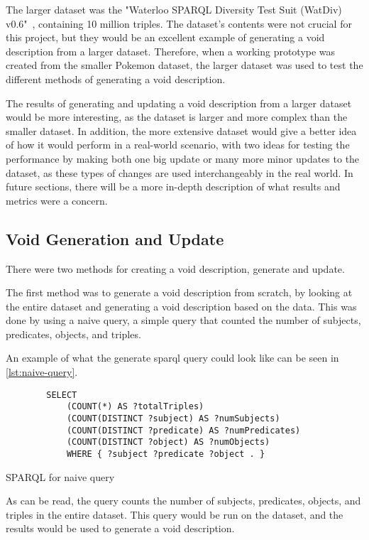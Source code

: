 The larger dataset was the "Waterloo SPARQL Diversity Test Suit (WatDiv) v0.6"~\cite{WatDiv}, containing 10 million triples. The dataset's contents were not crucial for this project, but they would be an excellent example of generating a \gls{void} description from a larger dataset. Therefore, when a working prototype was created from the smaller Pokemon dataset, the larger dataset was used to test the different methods of generating a \gls{void} description.

The results of generating and updating a \gls{void} description from a larger dataset would be more interesting, as the dataset is larger and more complex than the smaller dataset. In addition, the more extensive dataset would give a better idea of how it would perform in a real-world scenario, with two ideas for testing the performance by making both one big update or many more minor updates to the dataset, as these types of changes are used interchangeably in the real world. In future sections, there will be a more in-depth description of what results and metrics were a concern.

\subsection{Void Generation and Update}\label{sec:void}
There were two methods for creating a \gls{void} description, generate and update.

The first method was to generate a \gls{void} description from scratch, by looking at the entire dataset and generating a \gls{void} description based on the data. This was done by using a naive query, a simple query that counted the number of subjects, predicates, objects, and triples.

An example of what the generate \gls{sparql} query could look like can be seen in \autoref{lst:naive-query}.
\begin{listing}[!ht]
    \begin{verbatim}          
        SELECT
            (COUNT(*) AS ?totalTriples)
            (COUNT(DISTINCT ?subject) AS ?numSubjects)
            (COUNT(DISTINCT ?predicate) AS ?numPredicates)
            (COUNT(DISTINCT ?object) AS ?numObjects)
            WHERE { ?subject ?predicate ?object . }
    \end{verbatim}
    \caption{SPARQL for naive query}
    \label{lst:naive-query}
\end{listing}

As can be read, the query counts the number of subjects, predicates, objects, and triples in the entire dataset. This query would be run on the dataset, and the results would be used to generate a \gls{void} description.


